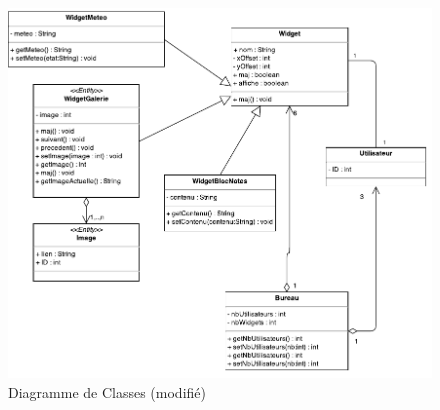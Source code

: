 \begin{figure}[H]
	\centering
	\includegraphics[angle=90]{diagrammes/DClasses.pdf}
	\caption{\color{green}Diagramme de Classes (modifié)\color{black}}
\end{figure}